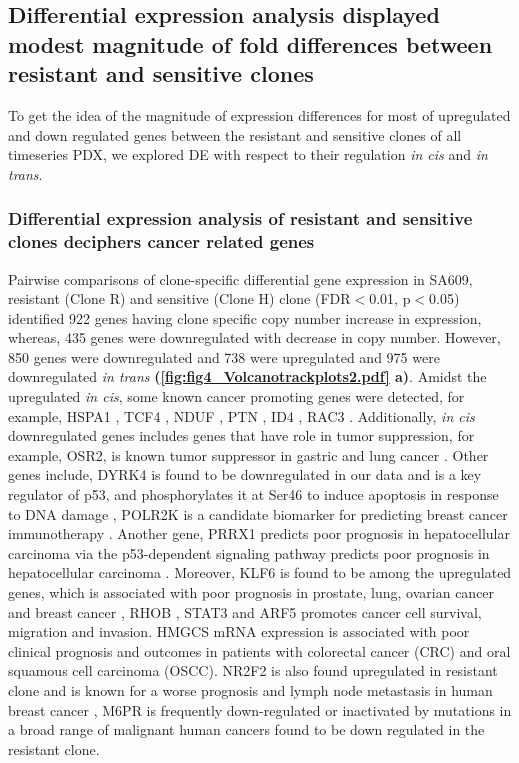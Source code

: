 \subsection{Differential expression analysis displayed modest magnitude of fold differences between resistant and sensitive clones}
To get the idea of the magnitude of expression differences for most of upregulated and down regulated genes between the resistant and sensitive clones of all timeseries PDX, we explored \ac{DE} with respect to their regulation \textit{in cis} and \textit{in trans}. 


 \subsubsection{Differential expression analysis of resistant and sensitive clones deciphers cancer related genes}
 
 Pairwise comparisons of clone-specific differential gene expression in SA609, resistant (Clone R) and sensitive (Clone H) clone (FDR$<$0.01, p$<$0.05) identified 922 genes having clone specific copy number increase in expression, whereas, 435 genes were downregulated with decrease in copy number. However, 850 genes were downregulated and 738 were upregulated and 975 were downregulated \textit{in trans} \textbf{(\autoref{fig:fig4_Volcanotrackplots2.pdf} a)}.  Amidst the upregulated \textit{in cis}, some known cancer promoting genes were detected, for example, HSPA1 \cite{zoppino2018comprehensive}, TCF4 \cite{ravindranath2011wnt}, NDUF \cite{li2015down}, PTN \cite{huang2018chemotherapy}, ID4 \cite{donzelli2018expression}, RAC3 \cite{donnelly2017rac3}. Additionally, \textit{in cis} downregulated genes includes genes that have role in tumor suppression, for example, OSR2, is known tumor suppressor in gastric and lung cancer \cite{otani2014odd,wang2018odd}. Other genes include, DYRK4 is found to be downregulated in our data and is a key regulator
of p53, and phosphorylates it at Ser46 to induce apoptosis in response to
DNA damage \cite{yoshida2019multiple}, POLR2K is a candidate biomarker for predicting breast cancer immunotherapy \cite{lopez2020prediction}. Another gene, PRRX1 predicts poor prognosis in hepatocellular carcinoma via the p53-dependent signaling pathway predicts poor prognosis in hepatocellular carcinoma \cite{fan2017downregulation}. Moreover,
KLF6 is found to be among the upregulated genes, which is associated with poor prognosis in prostate, lung, ovarian cancer and breast cancer \cite{hatami2013klf6,difeo2009role}, RHOB \cite{ju2018rhob},
STAT3 \cite{li2019clinicopathological,kamran2013role} and 
ARF5 \cite{li2017roles,casalou2020role} promotes cancer cell survival, migration and invasion. HMGCS \cite{chen2017hmgcs2} mRNA expression is associated with poor clinical prognosis and outcomes in
patients with colorectal cancer (CRC) and oral squamous cell carcinoma (OSCC). NR2F2 is also found upregulated in resistant clone and is known for a worse prognosis and lymph node metastasis in human breast cancer \cite{erdHos2020nr2f2,xia2020nr2f2},
M6PR is frequently down-regulated or inactivated by mutations in a broad range of malignant human cancers \cite{dalle2018mannose} found to be down regulated in the resistant clone.

